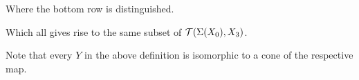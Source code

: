 \begin{definition}
\begin{enumerate}
{\begin{center}
        \end{center}

        Where the bottom row is distinguished.
    }
    \end{enumerate}

    Which all gives rise to the same subset of \( {\mathcal{T}}(\Sigma(X_0), X_3) \).
\end{definition}

\begin{remark}
    Note that every \( Y \) in the above definition is isomorphic to a cone of the respective map.
\end{remark}
